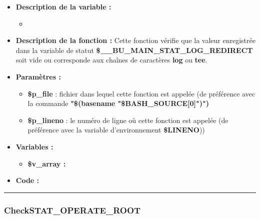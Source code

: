 \documentclass[a4paper,10pt]{article}
\begin{document}
\begin{itemize}
    \item \textbf{Description de la variable :}
    \begin{itemize}
        \item \textbf{}\\[1\baselineskip]
    \end{itemize}

    \item \textbf{Description de la fonction :} Cette fonction vérifie que la valeur enregistrée dans la variable de statut \textbf{\color{orange}\$\_\_BU\_MAIN\_STAT\_LOG\_REDIRECT} soit vide ou corresponde aux chaînes de caractères \textbf{log} ou \textbf{tee}.\\[1\baselineskip]

    \item \textbf{Paramètres :}
    \begin{itemize}
        \item \color{orange}\textbf{\$p\_file}\color{white} : fichier dans lequel cette fonction est appelée (de préférence avec la commande \textbf{"\$(\color{gray}basename \color{white}"\color{orange}\$BASH\_SOURCE[0]\color{white}")")}\\[1\baselineskip]

        \item \color{orange}\textbf{\$p\_lineno}\color{white} : le numéro de ligne où cette fonction est appelée (de préférence avec la variable d'environnement \textbf{\color{orange}\$LINENO}))\\[1\baselineskip]
    \end{itemize}

    \item \textbf{Variables :}
    \begin{itemize}
        \item \textbf{\color{orange}\$v\_array\color{white} :}\\[1\baselineskip]
    \end{itemize}

    \item \textbf{Code :}
\end{itemize}


\color{blue}\par\noindent\rule{\textwidth}{0.4pt}\color{white}

\color{blue}
\subsubsection{CheckSTAT\_OPERATE\_ROOT}\color{white}
\end{document}
